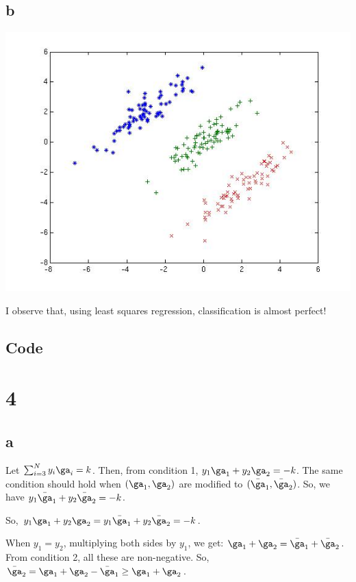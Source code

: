 \documentclass{article}
\begin{document}
\subsection{b}
\includegraphics[scale=.75]{logisticPrediction.jpg}

I observe that, using least squares regression, classification is almost perfect!

\subsection{Code}


\section{4}
\subsection{a}
Let $\sum_{i=3}^{N}y_{i}\ga_{i} = k$. Then, from condition 1, $y_{1}\ga_{1} +  y_{2}\ga_{2} = -k$. The same condition should hold when $(\ga_{1}, \ga_{2})$ are modified to $(\bar{\ga}_{1}, \bar{\ga}_{2})$. So, we have $y_{1}\bar{\ga}_{1} +  y_{2}\bar{\ga}_{2} = -k$.

So, $y_{1}\ga_{1} +  y_{2}\ga_{2} = y_{1}\bar{\ga}_{1} +  y_{2}\bar{\ga}_{2} = -k$.

When $y_{1} = y_{2}$, multiplying both sides by $y_{1}$, we get: $\ga_{1} + \ga_{2} = \bar{\ga}_{1} + \bar{\ga}_{2}$. From condition 2, all these are non-negative. So, $\bar{\ga}_{2} = \ga_{1} + \ga_{2} - \bar{\ga}_{1} \geq \ga_{1} + \ga_{2}$.
\end{document}
